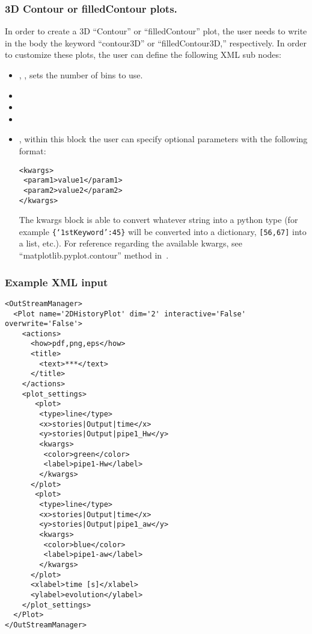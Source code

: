 \subsubsection{3D Contour or filledContour plots.}
In order to create a 3D ``Contour'' or ``filledContour'' plot, the user needs
to write in the  body the keyword ``contour3D'' or ``filledContour3D,'' respectively.
%
In order to customize these plots, the user can define the following XML sub
nodes:
\begin{itemize}
  \item {}, , sets the
  number of bins to use.
  \item {}
  \item {}
  \item {}
  \item {}, within this block the user can specify optional
  parameters with the following format:

\begin{lstlisting}[style=XML]
<kwargs>
 <param1>value1</param1>
 <param2>value2</param2>
</kwargs>
\end{lstlisting}

  The kwargs block is able to convert whatever string into a python type (for
  example \texttt{\{`1stKeyword':45\}} will
  be converted into a dictionary, 
  \texttt{[56,67]} into a list, etc.).
  For reference regarding the available kwargs, see
  ``matplotlib.pyplot.contour'' method in~\cite{MatPlotLib}.
\end{itemize}


\subsubsection{Example XML input}
\begin{lstlisting}[style=XML,morekeywords={name,dim,interactive,overwrite}]
<OutStreamManager>
  <Plot name='2DHistoryPlot' dim='2' interactive='False' overwrite='False'>
    <actions>
      <how>pdf,png,eps</how>
      <title>
        <text>***</text>
      </title>
    </actions>
    <plot_settings>
       <plot>
        <type>line</type>
        <x>stories|Output|time</x>
        <y>stories|Output|pipe1_Hw</y>
        <kwargs>
         <color>green</color>
         <label>pipe1-Hw</label>
        </kwargs>
      </plot>
       <plot>
        <type>line</type>
        <x>stories|Output|time</x>
        <y>stories|Output|pipe1_aw</y>
        <kwargs>
         <color>blue</color>
         <label>pipe1-aw</label>
        </kwargs>
      </plot>
      <xlabel>time [s]</xlabel>
      <ylabel>evolution</ylabel>
    </plot_settings>
  </Plot>
</OutStreamManager>
\end{lstlisting}
